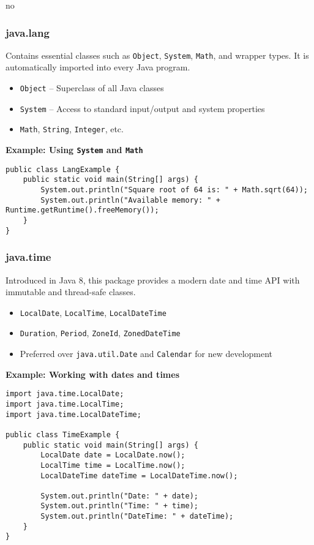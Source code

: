 no\documentclass{article}
\begin{document}
\subsubsection*{java.lang}

Contains essential classes such as \texttt{Object}, \texttt{System}, \texttt{Math}, and wrapper types. It is automatically imported into every Java program.

\begin{itemize}
    \item \texttt{Object} – Superclass of all Java classes
    \item \texttt{System} – Access to standard input/output and system properties
    \item \texttt{Math}, \texttt{String}, \texttt{Integer}, etc.
\end{itemize}

\noindent\textbf{Example: Using \texttt{System} and \texttt{Math}}
\begin{verbatim}
public class LangExample {
    public static void main(String[] args) {
        System.out.println("Square root of 64 is: " + Math.sqrt(64));
        System.out.println("Available memory: " + Runtime.getRuntime().freeMemory());
    }
}
\end{verbatim}

\subsubsection*{java.time}

Introduced in Java 8, this package provides a modern date and time API with immutable and thread-safe classes.

\begin{itemize}
    \item \texttt{LocalDate}, \texttt{LocalTime}, \texttt{LocalDateTime}
    \item \texttt{Duration}, \texttt{Period}, \texttt{ZoneId}, \texttt{ZonedDateTime}
    \item Preferred over \texttt{java.util.Date} and \texttt{Calendar} for new development
\end{itemize}

\noindent\textbf{Example: Working with dates and times}
\begin{verbatim}
import java.time.LocalDate;
import java.time.LocalTime;
import java.time.LocalDateTime;

public class TimeExample {
    public static void main(String[] args) {
        LocalDate date = LocalDate.now();
        LocalTime time = LocalTime.now();
        LocalDateTime dateTime = LocalDateTime.now();

        System.out.println("Date: " + date);
        System.out.println("Time: " + time);
        System.out.println("DateTime: " + dateTime);
    }
}
\end{verbatim}
\end{document}
